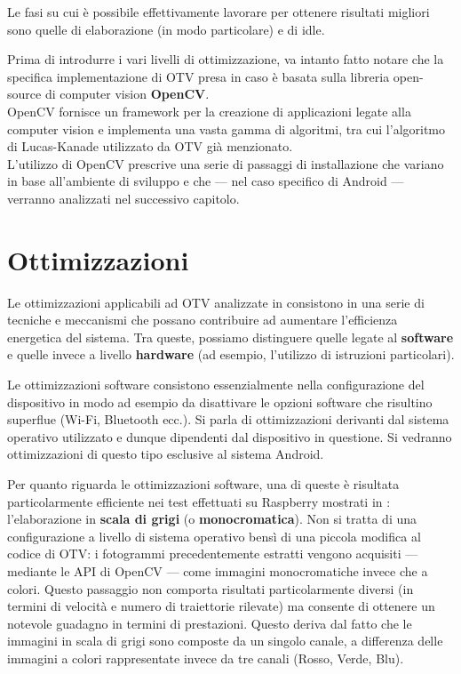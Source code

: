 Le fasi su cui è possibile effettivamente lavorare per ottenere risultati migliori sono quelle di elaborazione (in modo particolare)
e di idle.


Prima di introdurre i vari livelli di ottimizzazione, va intanto fatto notare che la specifica implementazione di OTV presa in
caso è basata sulla libreria open-source di computer vision \textbf{OpenCV}.\\
OpenCV fornisce un framework per la creazione di applicazioni legate alla computer vision e implementa una vasta gamma di
algoritmi, tra cui l'algoritmo di Lucas-Kanade utilizzato da OTV già menzionato.\\
L'utilizzo di OpenCV prescrive una serie di passaggi di installazione che variano in base all'ambiente di sviluppo e che
--- nel caso specifico di Android --- verranno analizzati nel successivo capitolo.

\section{Ottimizzazioni}
\label{sec:ottim}

Le ottimizzazioni applicabili ad OTV analizzate in \cite{rs12122047} consistono in una serie di tecniche e meccanismi che
possano contribuire ad aumentare l'efficienza energetica del sistema. %
Tra queste, possiamo distinguere quelle legate al \textbf{software} e quelle invece a livello \textbf{hardware} 
(ad esempio, l'utilizzo di istruzioni particolari).

Le ottimizzazioni software consistono essenzialmente nella configurazione del dispositivo in modo ad esempio
da disattivare le opzioni software che risultino superflue (Wi-Fi, Bluetooth ecc.). Si parla di ottimizzazioni derivanti dal
sistema operativo utilizzato e dunque dipendenti dal dispositivo in questione. Si vedranno ottimizzazioni di questo tipo
esclusive al sistema Android.

Per quanto riguarda le ottimizzazioni software, una di queste è risultata particolarmente efficiente nei test effettuati
su Raspberry mostrati in \cite{app11157027}: l'elaborazione in \textbf{scala di grigi} (o \textbf{monocromatica}). 
Non si tratta di una configurazione a livello di sistema operativo bensì di una piccola modifica al codice di OTV: 
i fotogrammi precedentemente estratti vengono acquisiti --- mediante le API di OpenCV --- come immagini monocromatiche invece 
che a colori. Questo passaggio non comporta  risultati particolarmente diversi (in termini di velocità e numero di 
traiettorie rilevate) ma consente di ottenere un notevole guadagno in termini di prestazioni. Questo deriva dal fatto che le 
immagini in scala di grigi sono composte da un singolo canale, a differenza delle immagini a colori rappresentate invece da 
tre canali (Rosso, Verde, Blu).

